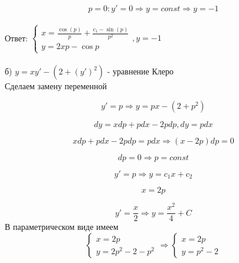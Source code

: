 \documentclass{article}
\begin{document}
\begin{equation*}
    p = 0: y' = 0 \Rightarrow y = const \Rightarrow y = -1
\end{equation*}
\\
Ответ:
$
    \begin{cases}
    x = \frac{\cos{(p)}}{p} + \frac{c_1 - \sin{(p)}}{p^2} \\
    y = 2xp - \cos{p}
    \end{cases} , y = -1
$\\\\
б) $y = xy' - (2 + (y')^2)\text{ - уравнение Клеро}$\\

Сделаем замену переменной

\begin{equation*}
    y' = p \Rightarrow  y = px - (2 + p^2)
\end{equation*}

\begin{equation*}
    dy = xdp + pdx - 2pdp,  dy = pdx
\end{equation*}

\begin{equation*}
    xdp +pdx - 2pdp = pdx \Rightarrow (x - 2p) dp = 0
\end{equation*}

\begin{equation*}
    dp = 0 \Rightarrow  p = const
\end{equation*}

\begin{equation*}
    y' = p \Rightarrow y = c_1x + c_2
\end{equation*}

\begin{equation*}
    x = 2p
\end{equation*}

\begin{equation*}
    y' = \frac{x}{2} \Rightarrow y = \frac{x^2}{4} + C
\end{equation*}
В параметрическом виде имеем
\begin{equation*}
    \begin{cases}
    x = 2p \\
    y = 2p^2 - 2 - p^2
    \end{cases}
    \Rightarrow
    \begin{cases}
    x = 2p \\
    y = p^2 - 2
    \end{cases}
\end{equation*}
\end{document}
